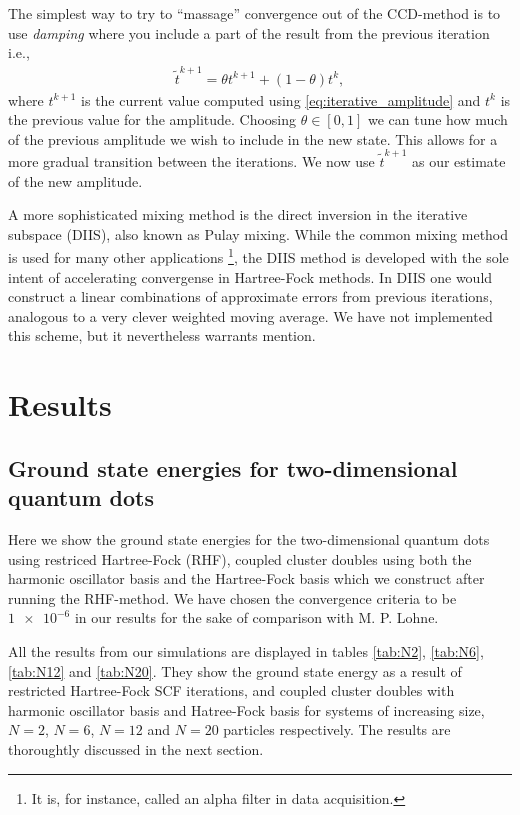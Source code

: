 \documentclass[
    a4paper, aps, twocolumn, floatfix, superscriptaddress,
    nofootinbib]{revtex4-1}
\newcommand{\1}{\mathds{1}}
\begin{document}
        The simplest way to try to ``massage'' convergence out of the CCD-method
        is to use \emph{damping} where you include a part of the result from the
        previous iteration i.e.,
        \begin{align}
            \tilde{t}^{k + 1} = \theta t^{k + 1} + (1 - \theta)t^k,
            \label{eq:mixing}
        \end{align}
        where $t^{k + 1}$ is the current value computed using
        \autoref{eq:iterative_amplitude} and $t^k$ is the previous value for the
        amplitude. Choosing $\theta \in [0, 1]$ we can tune how much of the
        previous amplitude we wish to include in the new state. This allows for
        a more gradual transition between the iterations. We now use
        $\tilde{t}^{k + 1}$ as our estimate of the new amplitude.

        A more sophisticated mixing method is the direct inversion
        in the iterative subspace (DIIS), also known as Pulay mixing. While the
        common mixing method is used for many other applications
        \footnote{It is, for instance, called an alpha filter in data acquisition.},
        the DIIS method is developed with the sole intent of accelerating
        convergense in Hartree-Fock methods. In DIIS one would construct a
        linear combinations of approximate errors from previous iterations,
        analogous to a very clever weighted moving average. We have not implemented
        this scheme, but it nevertheless warrants mention.

\section{Results}

    \subsection{Ground state energies for two-dimensional quantum dots}
        Here we show the ground state energies for the two-dimensional quantum
        dots using restriced Hartree-Fock (RHF), coupled cluster doubles using
        both the harmonic oscillator basis and the Hartree-Fock basis which we
        construct after running the RHF-method. We have chosen the convergence
        criteria to be $\num{1e-6}$ in our results for the sake of comparison
        with M. P. Lohne\cite{lohne2011ab}.

        All the results from our simulations are displayed in tables \ref{tab:N2},
        \ref{tab:N6}, \ref{tab:N12} and \ref{tab:N20}. They show the ground state
        energy as a result of restricted Hartree-Fock SCF iterations, and coupled
        cluster doubles with harmonic oscillator basis and Hatree-Fock basis for
        systems of increasing size, $N=2$, $N=6$, $N=12$ and $N=20$ particles
        respectively. The results are thoroughtly discussed in the next section.
\end{document}
